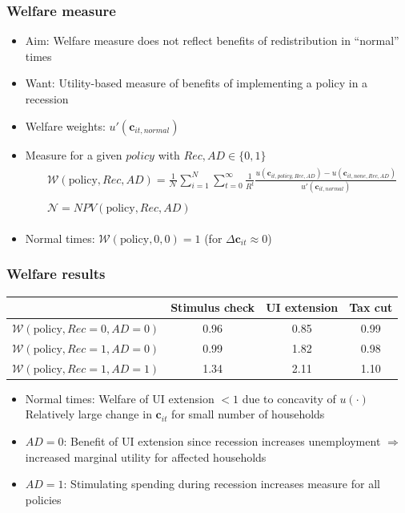 \documentclass[pdflatex,aspectratio=169, handout]{beamer}
\begin{document}
\begin{frame}
\frametitle{Welfare measure}
\begin{itemize}[<+->]
\item Aim: Welfare measure does not reflect benefits of redistribution in ``normal'' times
\item Want: Utility-based measure of benefits of implementing a policy in a recession
\item Welfare weights: $u'(\mathbf{c}_{it,\textit{normal}})$
\item Measure for a given $policy$ with $Rec,AD\in\{0,1\}$
\begin{equation}\begin{gathered}\begin{aligned}
& \mathcal{W}(\text{policy},Rec,AD) =\frac{1}{\mathcal{N}} \sum_{i=1}^{N} \sum_{t=0}^{\infty} \frac{1}{R^t} \frac{u(\mathbf{c}_{it,\textit{policy},Rec,AD}) - u(\mathbf{c}_{it,\textit{none},Rec,AD})}{ u'(\mathbf{c}_{it,\textit{normal}})} \\ \\ 
& \mathcal{N} = NPV(\text{policy},Rec,AD)
\end{aligned}\end{gathered}\end{equation}
\item Normal times: $\mathcal{W}(\text{policy},0,0) = 1$ (for $\Delta \mathbf{c}_{it}\approx 0$)
\end{itemize}
\end{frame}

\begin{frame}
	\frametitle{Welfare results}
	\centering 
	\begin{tabular}{@{}lccc@{}} 
		\toprule 
		& Stimulus check      & UI extension    & Tax cut    \\  \midrule 
		$\mathcal{W}(\text{policy}, Rec=0, AD=0)$ & 0.96  & 0.85  & 0.99     \\ 
		$\mathcal{W}(\text{policy}, Rec=1, AD=0)$ & 0.99  & 1.82  & 0.98     \\ 
		$\mathcal{W}(\text{policy}, Rec=1, AD=1)$ & 1.34  & 2.11  & 1.10     \\ \bottomrule
	\end{tabular} 
		\medskip
\begin{itemize}[<+->]
  \itemsep = .75\bigskipamount 
\item Normal times: Welfare of UI extension $< 1$ due to concavity of $u(\cdot)$ \\[1ex] 
Relatively large change in $\mathbf{c}_{it}$ for small number of households 
\item $AD=0$: Benefit of UI extension since recession increases unemployment $\Rightarrow$ increased marginal utility for affected households 
\item $AD=1$: Stimulating spending during recession increases measure for all policies 
\end{itemize}
\end{frame}
\end{document}
